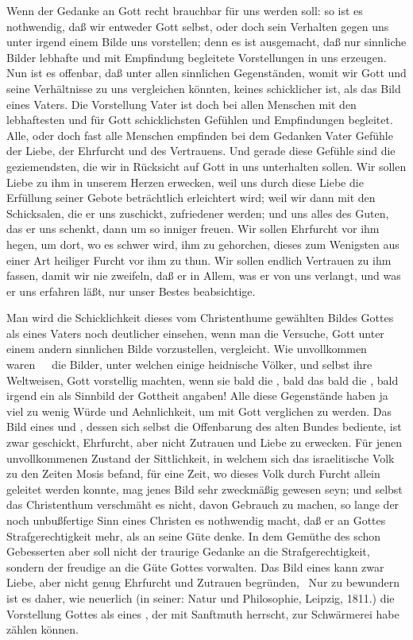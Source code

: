 Wenn der Gedanke an Gott recht brauchbar für uns werden soll: so ist es nothwendig, daß wir entweder Gott selbst, oder doch sein Verhalten gegen uns unter irgend einem Bilde uns vorstellen; denn es ist ausgemacht, daß nur sinnliche Bilder lebhafte und mit Empfindung begleitete Vorstellungen in uns erzeugen. Nun ist es offenbar, daß unter allen sinnlichen Gegenständen, womit wir Gott und seine Verhältnisse zu uns vergleichen könnten, keines schicklicher ist, als das Bild eines Vaters. Die Vorstellung Vater ist doch bei allen Menschen mit den lebhaftesten und für Gott schicklichsten Gefühlen und Empfindungen begleitet. Alle, oder doch fast alle Menschen empfinden bei dem Gedanken Vater Gefühle der Liebe, der Ehrfurcht und des Vertrauens. Und gerade diese Gefühle sind die geziemendsten, die wir in Rücksicht auf Gott in uns unterhalten sollen. Wir sollen Liebe zu ihm in unserem Herzen erwecken, weil uns durch diese Liebe die Erfüllung seiner Gebote beträchtlich erleichtert wird; weil wir dann mit den Schicksalen, die er uns zuschickt, zufriedener werden; und uns alles des Guten, das er uns schenkt, dann um so inniger freuen. Wir sollen Ehrfurcht vor ihm hegen, um dort, wo es schwer wird, ihm zu gehorchen, dieses zum Wenigsten aus einer Art heiliger Furcht vor ihm zu thun. Wir sollen endlich Vertrauen zu ihm fassen, damit wir nie zweifeln, daß er in Allem, was er von uns verlangt, und was er uns erfahren läßt, nur unser Bestes beabsichtige.
\begin{RWanm} 
Man wird die Schicklichkeit dieses vom Christenthume gewählten Bildes Gottes als eines Vaters noch deutlicher einsehen, wenn man die Versuche, Gott unter einem andern sinnlichen Bilde vorzustellen, vergleicht. Wie unvollkommen waren~\ \zB\ die Bilder, unter welchen einige heidnische Völker, und selbst ihre Weltweisen, Gott vorstellig machten, wenn sie bald die , bald das  bald die , bald irgend ein  als Sinnbild der Gottheit angaben! Alle diese Gegenstände haben ja viel zu wenig Würde und Aehnlichkeit, um mit Gott verglichen zu werden. Das Bild eines  und , dessen sich selbst die Offenbarung des alten Bundes bediente, ist zwar geschickt, Ehrfurcht, aber nicht Zutrauen und Liebe zu erwecken. Für jenen unvollkommenen Zustand der Sittlichkeit, in welchem sich das israelitische Volk zu den Zeiten Mosis befand, für eine Zeit, wo dieses Volk durch Furcht allein geleitet werden konnte, mag jenes Bild sehr zweckmäßig gewesen seyn; und selbst das Christenthum verschmäht es nicht, davon Gebrauch zu machen, so lange der noch unbußfertige Sinn eines Christen es nothwendig macht, daß er an Gottes Strafgerechtigkeit mehr, als an seine Güte denke. In dem Gemüthe des schon Gebesserten aber soll nicht der traurige Gedanke an die Strafgerechtigkeit, sondern der freudige an die Güte Gottes vorwalten. Das Bild eines  kann zwar Liebe, aber nicht genug Ehrfurcht und Zutrauen begründen, \usw\ Nur zu bewundern ist es daher, wie neuerlich  (in seiner: Natur und Philosophie, Leipzig, 1811.) die Vorstellung Gottes als eines , der mit Sanftmuth herrscht, zur Schwärmerei habe zählen können. 
\end{RWanm}

